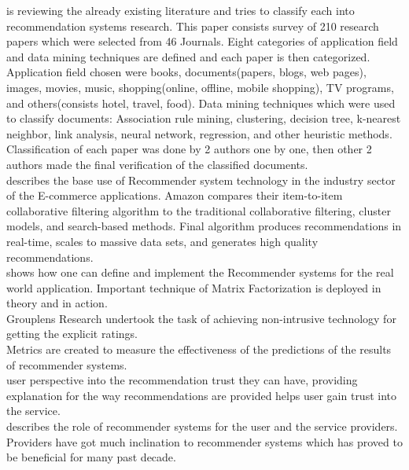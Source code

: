 \documentclass[12pt,a4paper]{article}
\begin{document}
	\cite{park2012literature} is reviewing the already existing literature and tries to classify each into recommendation systems research. This paper consists survey of 210 research papers which were selected from 46 Journals. Eight categories of application field and data mining techniques are defined and each paper is then categorized. Application field chosen were books, documents(papers, blogs, web pages), images, movies, music, shopping(online, offline, mobile shopping), TV programs, and others(consists hotel, travel, food). Data mining techniques which were used to classify documents: Association rule mining, clustering, decision tree, k-nearest neighbor, link analysis, neural network, regression, and other heuristic methods. Classification of each paper was done by 2 authors one by one, then other 2 authors made the final verification of the	classified documents.\\
	
	\cite{linden2003amazon} describes the base use of Recommender system technology in the industry sector of the E-commerce applications. Amazon compares their item-to-item collaborative filtering algorithm to the traditional  collaborative filtering, cluster models, and search-based methods. Final algorithm produces recommendations in real-time, scales to massive data sets, and generates high quality recommendations.\\
	
	\cite{sarwar2001item} shows how one can define and implement the Recommender systems for the real world application. Important technique of Matrix Factorization is deployed in theory and in action.\\
	
	\cite{konstan1997grouplens} Grouplens Research undertook the task of achieving non-intrusive technology for getting the explicit ratings. \\
	
	\cite{schein2002methods} Metrics are created to measure the effectiveness of the predictions of the results of recommender systems.\\
	
	\cite{tintarev2011designing} user perspective into the recommendation trust they can have, providing explanation for the way recommendations are provided helps user gain trust into the service.\\
	
	\cite{ricci2011introduction} describes the role of recommender systems for the user and the service providers. Providers have got much inclination to recommender systems which has proved to be beneficial for many past decade.\\
	
\end{document}
